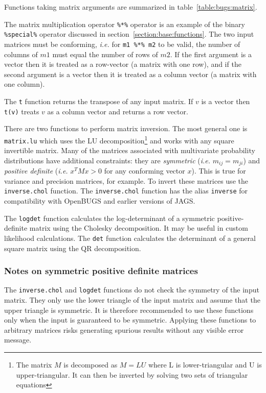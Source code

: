 \documentclass[11pt, a4paper, titlepage]{report}
\begin{document}
Functions taking matrix arguments are summarized in
table~\ref{table:bugs:matrix}.

The matrix multiplication operator \verb+%*%+ operator is an example
of the binary \verb+%special%+ operator discussed in
section~\ref{section:base:functions}. The two input matrices must be
conforming, {\em i.e.} for \verb+m1 %*% m2+ to be valid, the number of
columns of $m1$ must equal the number of rows of $m2$. If the first
argument is a vector then it is treated as a row-vector (a matrix with
one row), and if the second argument is a vector then it is treated as
a column vector (a matrix with one column).

The \texttt{t} function returns the transpose of any input matrix. If
$v$ is a vector then \texttt{t(v)} treats $v$ as a column vector and
returns a row vector.

There are two functions to perform matrix inversion. The most general
one is \texttt{matrix.lu} which uses the LU decomposition\footnote{The
  matrix $M$ is decomposed as $M = LU$ where L is lower-triangular and
  U is upper-triangular. It can then be inverted by solving two sets
  of triangular equations} and works with any square invertible
matrix.  Many of the matrices associated with multivariate probability
distributions have additional constraints: they are {\em symmetric}
({\em i.e.} $m_{ij} = m_{ji}$) and {\em positive definite} ({\em i.e.}
$x^T M x > 0$ for any conforming vector $x$). This is true for
variance and precision matrices, for example. To invert these matrices
use the \texttt{inverse.chol} function. The \texttt{inverse.chol}
function has the alias \texttt{inverse} for compatibility with
OpenBUGS and earlier versions of JAGS.

The \texttt{logdet} function calculates the log-determinant of a
symmetric positive-definite matrix using the Cholesky
decomposition. It may be useful in custom likelihood calculations. The
\texttt{det} function calculates the determinant of a general square
matrix using the QR decomposition.

\subsubsection{Notes on symmetric positive definite matrices}

The \texttt{inverse.chol} and \texttt{logdet} functions do not check
the symmetry of the input matrix. They only use the lower triangle of
the input matrix and assume that the upper triangle is symmetric. It
is therefore recommended to use these functions only when the input is
guaranteed to be symmetric. Applying these functions to arbitrary
matrices risks generating spurious results without any visible error
message. 
\end{document}
